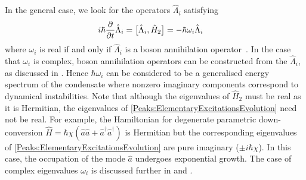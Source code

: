 In the general case, we look for the operators $\hat{\Lambda}_i$ satisfying
\begin{align}
    \label{Peaks:ElementaryExcitationsEvolution}
    i \hbar \frac{\partial }{\partial t}\hat{\Lambda}_i &= \comm{\hat{\Lambda}_i, \hat{H}_2 } = - \hbar \omega_i \hat{\Lambda}_i
\end{align}
where $\omega_i$ is real if and only if $\hat{\Lambda}_i$ is a boson annihilation operator~\citep{Leonhardt:2003}. In the case that $\omega_i$ is complex, boson annihilation operators can be constructed from the $\hat{\Lambda}_i$, as discussed in . Hence $\hbar\omega_i$ can be considered to be a generalised energy spectrum of the condensate where nonzero imaginary components correspond to dynamical instabilities. Note that although the eigenvalues of $\hat{H}_2$ must be real as it is Hermitian, the eigenvalues of \eqref{Peaks:ElementaryExcitationsEvolution} need not be real. For example, the Hamiltonian for degenerate parametric down-conversion $\hat{H} = \hbar\chi \left(\hat{a}\hat{a} + \hat{a}^\dagger \hat{a}^\dagger \right)$ is Hermitian but the corresponding eigenvalues of \eqref{Peaks:ElementaryExcitationsEvolution} are pure imaginary ($\pm i \hbar \chi$). In this case, the occupation of the mode $\hat{a}$ undergoes exponential growth. The case of complex eigenvalues $\omega_i$ is discussed further in  and .

